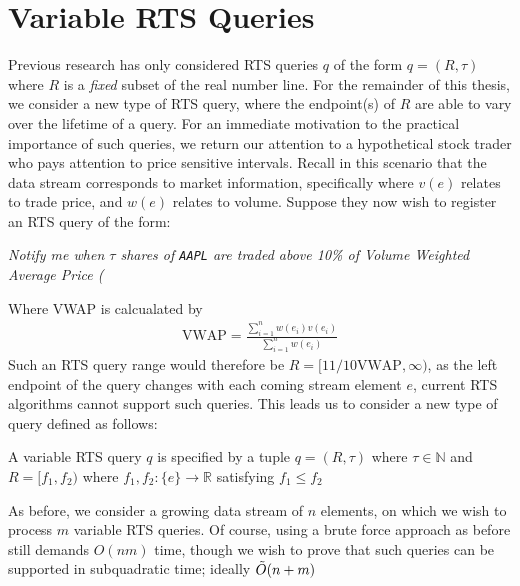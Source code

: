 \section{Variable RTS Queries}

Previous research has only considered RTS queries $q$ of the form $q = (R, \tau)$ where $R$ is a \textit{fixed} subset of the real number line. For the remainder of this thesis, we consider a new type of RTS query, where the endpoint(s) of $R$ are able to vary over the lifetime of a query. For an immediate motivation to the practical importance of such queries, we return our attention to a hypothetical stock trader who pays attention to price sensitive intervals. Recall in this scenario that the data stream corresponds to market information, specifically where $v(e)$ relates to trade price, and $w(e)$ relates to volume. Suppose they now wish to register an RTS query of the form: 
\begin{center}
    \textit{Notify me when $\tau$ shares of \texttt{AAPL} are traded above 10\% of Volume Weighted Average Price (}
\end{center}
Where VWAP is calcualated by 
\begin{align}
    \text{VWAP} = \frac{\sum_{i=1}^{n} w(e_i)v(e_i)}{\sum_{i=1}^{n}w(e_i)}
\end{align}
Such an RTS query range would therefore be $R = [11/10\text{VWAP}, \infty)$, as the left endpoint of the query changes with each coming stream element $e$, current RTS algorithms cannot support such queries. This leads us to consider a new type of query defined as follows:

\begin{definition}
    A variable RTS query $q$ is specified by a tuple $q = (R,\tau)$ where $\tau\in \mathbb{N}$ and $R = [f_1, f_2)$ where $f_1, f_2 : \{e\}\rightarrow\mathbb{R}$ satisfying $f_1 \leq f_2$
\end{definition}
As before, we consider a growing data stream of $n$ elements, on which we wish to process $m$ variable RTS queries. Of course, using a brute force approach as before still demands $O(nm)$ time, though we wish to prove that such queries can be supported in subquadratic time; ideally $\Tilde{O}(n+m)$